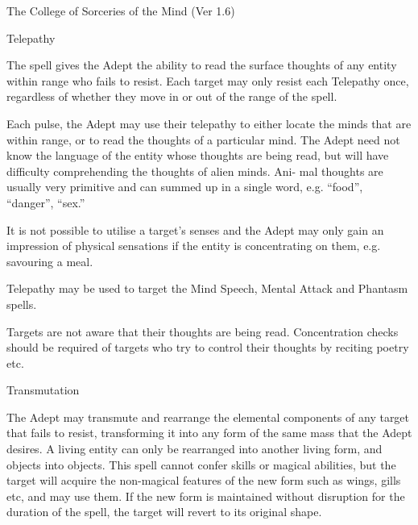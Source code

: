 \begin{Chapter}{The College of Sorceries of the Mind (Ver 1.6)}
\begin{spell}[S-9]{Telepathy}
\begin{effects}
The spell gives the Adept the ability to read the surface thoughts of
any entity within range who fails to resist. Each target may only
resist each Telepathy once, regardless of whether they move in or out
of the range of the spell.

Each pulse, the Adept may use their telepathy to either locate the
minds that are within range, or to read the thoughts of a particular
mind.  The Adept need not know the language of the entity whose
thoughts are being read, but will have difficulty comprehending the
thoughts of alien minds.  Ani- mal thoughts are usually very primitive
and can summed up in a single word, e.g. “food”, “danger”, “sex.”

It is not possible to utilise a target’s senses and the Adept may only
gain an impression of physical sensations if the entity is
concentrating on them, e.g. savouring a meal.

Telepathy may be used to target the Mind Speech, Mental Attack and
Phantasm spells.

Targets are not aware that their thoughts are being read.
Concentration checks should be required of targets who try to control
their thoughts by reciting poetry etc.
\end{effects}
\end{spell}

\begin{spell}[S-10]{Transmutation}

\begin{effects}
The Adept may transmute and rearrange the elemental components of any
target that fails to resist, transforming it into any form of the same
mass that the Adept desires.  A living entity can only be rearranged
into another living form, and objects into objects. This spell cannot
confer skills or magical abilities, but the target will acquire the
non-magical features of the new form such as wings, gills etc, and may
use them. If the new form is maintained without disruption for the
duration of the spell, the target will revert to its original shape.
\end{effects}
\end{spell}

\end{Chapter}
